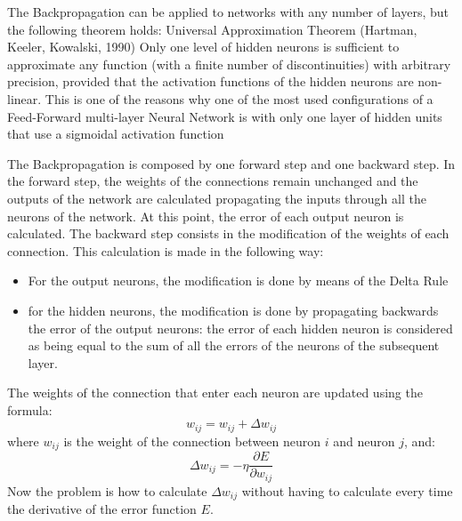 The Backpropagation can be applied to networks with any number of layers, but
the following theorem holds:
Universal Approximation Theorem (Hartman, Keeler, Kowalski, 1990)
Only one level of hidden neurons is sufficient to approximate any function
(with a finite number of discontinuities) with arbitrary precision, provided
that the activation functions of the hidden neurons are non-linear.
This is one of the reasons why one of the most used configurations of a
Feed-Forward multi-layer Neural Network is with only one layer of hidden units
that use a sigmoidal activation function


\vspace{10pt}

The Backpropagation is composed by one forward step and one backward step.
In the forward step, the weights of the connections remain unchanged and the
outputs of the network are calculated propagating the inputs through all the
neurons of the network.
At this point, the error of each output neuron is calculated.
The backward step consists in the modification of the weights of each connection.
This calculation is made in the following way:

\begin{itemize}
    \item  For the output neurons, the modification is done by means of the Delta Rule
    \item for the hidden neurons, the modification is done by propagating backwards
the error of the output neurons: the error of each hidden neuron is
considered as being equal to the sum of all the errors of the neurons of the
subsequent layer.
\end{itemize}

The weights of the connection that enter each neuron are updated using the formula:
\begin{equation*}
w_{ij} = w_{ij} + \Delta w_{ij}
\end{equation*}
where $w_{ij}$ is the weight of the connection between neuron $i$ and neuron $j$, and:
\begin{equation*}
\Delta w_{ij} = -\eta \frac{\partial E}{\partial w_{ij}}
\end{equation*}
Now the problem is how to calculate $\Delta w_{ij}$ without having to calculate every time the derivative of the error function $E$.


